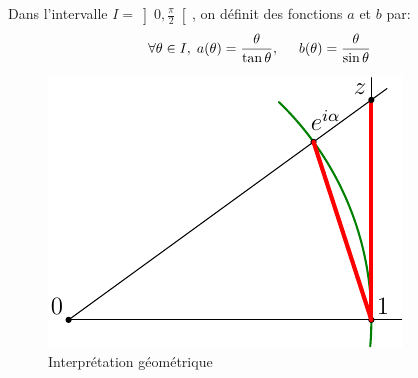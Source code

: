 Dans l'intervalle $I=\left]0,\frac{\pi}{2} \right[$, on définit des fonctions $a$ et $b$ par:
\begin{displaymath}
  \forall \theta\in I,\; a(\theta) = \frac{\theta}{\tan \theta}, \hspace{0.5cm} b(\theta) = \frac{\theta}{\sin \theta}
\end{displaymath}
\begin{figure}[h]
  \centering
  \includegraphics{./Egregory_1.pdf}
  \caption{Interprétation géométrique}
  \label{fig: Egregory_1}
\end{figure}

